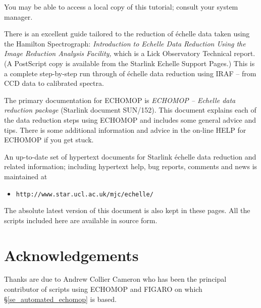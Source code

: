 \documentclass[twoside,11pt]{article}
\newcommand{\stardocinitials}  {SC}
\newcommand{\stardocnumber}    {3.2-0} %
\newcommand{\stardocname}{\stardocinitials /\stardocnumber}
\newcommand{\htmladdnormallink}[2]{#1}
\newenvironment{latexonly}{}{}
\newcommand{\htmlref}[2]{#1}
\newcommand{\xref}[3]{#1}
\newcommand{\xlabel}[1]{}
\newcommand{\scspec}[2]{#1}
\newcommand{\scspec}[2]{#2}
\newcommand{\EchelleHomePage}{http://www.starlink.ac.uk/echomop/echelle/}
\begin{document}
You may be able to access a local copy of this tutorial; consult your
system manager.

There is an excellent guide tailored to the reduction of \'{e}chelle
data taken using the Hamilton Spectrograph:
\htmladdnormallink{{\sl Introduction to Echelle
Data Reduction  Using the Image Reduction Analysis Facility,}}
{\EchelleHomePage/misc/LickTech74.ps.gz}
which is a
Lick Observatory Technical report\@.
\begin{latexonly}
(A PostScript copy is available from the Starlink Echelle Support
Pages.)
\end{latexonly}
This is a complete
step-by-step run through of \'{e}chelle data reduction using IRAF
\scspec{--}{-} from CCD data to calibrated spectra.

The primary documentation for ECHOMOP is \xref{{\sl ECHOMOP
\scspec{--}{-} Echelle
data reduction package} (Starlink document SUN/152)}{sun152}{}\@.
This document explains each of the data reduction steps using ECHOMOP and
includes some general advice and tips.
There is some additional information and advice in the on-line HELP for
ECHOMOP if you get stuck.

An up-to-date set of hypertext documents for Starlink \'{e}chelle data
reduction and related information; including hypertext help, bug
reports, comments and news is maintained at

\begin{itemize}

\item \scspec{{\tt http://www.star.ucl.ac.uk/mjc/echelle/}}
      {\htmladdnormallink{\verb+http://www.star.ucl.ac.uk/~mjc/echelle/+}
      {http://www.star.ucl.ac.uk/~mjc/echelle/}}

\end{itemize}

The absolute latest version of this document is also kept in these pages.
All the scripts included here are available in source form.


\section{\label{se_acknowledgements}\xlabel{acknowledgements}Acknowledgements }
\markboth{Acknowledgements}{\stardocname}

Thanks are due to Andrew Collier Cameron who has been the principal
contributor of scripts using ECHOMOP and FIGARO on which
\scspec{\S\ref{se_automated_echomop} is}
{the \htmlref{automated reductions}{se_automated_echomop} are}
based.
\end{document}
